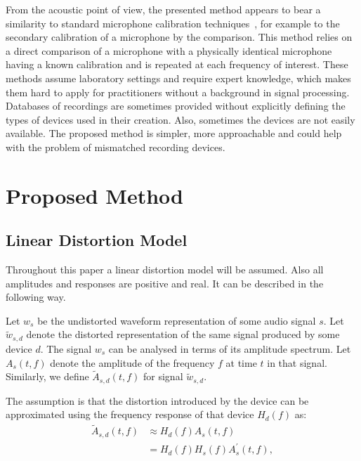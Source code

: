 \documentclass[a4paper]{article}
\newcommand{\inpos}{}
\newcommand{\va}{A}
\newcommand{\vh}{H}
\newcommand{\vw}{w}
\newcommand{\vs}{s}
\newcommand{\ff}{f}
\newcommand{\wave}[1]{\widetilde{\vw}_{#1}}
\newcommand{\dd}{d}
\newcommand{\ampltf}[1]{\widetilde{\va}_{#1}\left(t,\ff\right)}
\newcommand{\respf}[1]{\vh_{#1}\left(\ff\right)}
\newcommand{\magntf}[2][]{\va_{#2}^{#1}\left(t,\ff\right)}
\begin{document}
From the acoustic point of view, the presented method appears to bear a similarity to standard microphone calibration techniques~\cite{iec-61094-5}, for example to the secondary calibration of a microphone by the comparison. This method relies on a direct comparison of a microphone with a physically identical microphone having a known calibration and is repeated at each frequency of interest. These methods assume laboratory settings and require expert knowledge, which makes them hard to apply for practitioners without a background in signal processing. Databases of recordings are sometimes provided without explicitly defining the types of devices used in their creation. Also, sometimes the devices are not easily available. The proposed method is simpler, more approachable and could help with the problem of mismatched recording devices.



\section{Proposed Method}
\label{sec:proposed-method}

\subsection{Linear Distortion Model}
\label{ssec:dist-model}

Throughout this paper a linear distortion model will be assumed. Also all amplitudes and responses are positive and real. It can be described in the following way.

Let $\vw_\vs$ be the undistorted waveform representation of some audio signal $\vs$. Let $\wave{\vs,\dd}$ denote the distorted representation of the same signal produced by some device $\dd$. The signal $\vw_\vs$ can be analysed in terms of its amplitude spectrum. Let $\magntf{\vs}\inpos$ denote the amplitude of the frequency $\ff$ at time $t$ in that signal. Similarly, we define $\ampltf{\vs,\dd}\inpos$ for signal $\wave{\vs,\dd}$.

The assumption is that the distortion introduced by the device can be approximated using the frequency response of that device $\respf{\dd}\inpos$ as:
\begin{align}
    \label{eq:linear-distortion}
    \ampltf{\vs,\dd} &\approx \respf{\dd} \magntf{\vs} \\\label{eq:linear-distortion2}
    &=\respf{\dd} \respf{\vs} \magntf[\prime]{\vs},
\end{align}
\end{document}
